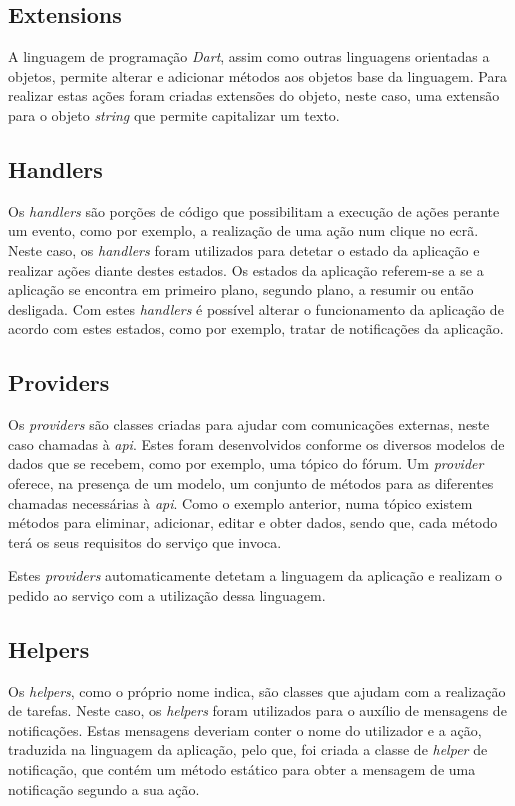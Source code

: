 \subsection{Extensions}
A linguagem de programação \textit{Dart}, assim como outras linguagens orientadas a objetos, permite alterar e adicionar métodos aos objetos base da linguagem. Para realizar estas ações foram criadas extensões do objeto, neste caso, uma extensão para o objeto \textit{string} que permite capitalizar um texto.

\subsection{Handlers}
Os \textit{handlers} são porções de código que possibilitam a execução de ações perante um evento, como por exemplo, a realização de uma ação num clique no ecrã. Neste caso, os \textit{handlers} foram utilizados para detetar o estado da aplicação e realizar ações diante destes estados. Os estados da aplicação referem-se a se a aplicação se encontra em primeiro plano, segundo plano, a resumir ou então desligada. Com estes \textit{handlers} é possível alterar o funcionamento da aplicação de acordo com estes estados, como por exemplo, tratar de notificações da aplicação.

\newpage

\subsection{Providers}
Os \textit{providers} são classes criadas para ajudar com comunicações externas, neste caso chamadas à \textit{\acrshort{api}}. Estes foram desenvolvidos conforme os diversos modelos de dados que se recebem, como por exemplo, uma tópico do fórum. Um \textit{provider} oferece, na presença de um modelo, um conjunto de métodos para as diferentes chamadas necessárias à \textit{\acrshort{api}}. Como o exemplo anterior, numa tópico existem métodos para eliminar, adicionar, editar e obter dados, sendo que, cada método terá os seus requisitos do serviço que invoca.

Estes \textit{providers} automaticamente detetam a linguagem da aplicação e realizam o pedido ao serviço com a utilização dessa linguagem.

\subsection{Helpers}
Os \textit{helpers}, como o próprio nome indica, são classes que ajudam com a realização de tarefas. Neste caso, os \textit{helpers} foram utilizados para o auxílio de mensagens de notificações. Estas mensagens deveriam conter o nome do utilizador e a ação, traduzida na linguagem da aplicação, pelo que, foi criada a classe de \textit{helper} de notificação, que contém um método estático para obter a mensagem de uma notificação segundo a sua ação.